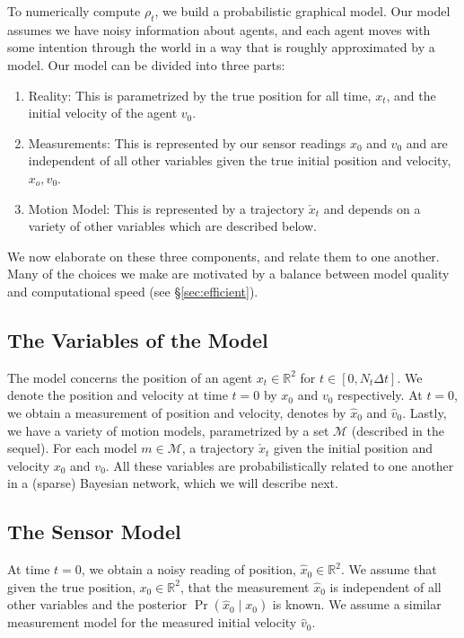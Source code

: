 \documentclass[letterpaper,10pt,conference]{ieeeconf}
\begin{document}
To numerically compute $\rho_t$, we build a probabilistic graphical model.
Our model assumes we have noisy information about agents, and each agent moves with some intention through the world in a way that is roughly approximated by a model.
Our model can be divided into three parts:
\begin{enumerate}
	\item Reality: This is parametrized by the true position for all time, $x_t$, and the initial velocity of the agent $v_0$.
	\item Measurements:  This is represented by our sensor readings $\hat{x}_0$ and $\hat{v}_0$ and are independent of all other variables given the true initial position and velocity, $x_o, v_0$.
	\item Motion Model: This is represented by a trajectory $\check{x}_t$ and depends on a variety of other variables which are described below.
\end{enumerate}
We now elaborate on these three components, and relate them to one another.
Many of the choices we make are motivated by a balance between model quality and computational speed (see \S \ref{sec:efficient}).

\subsection{The Variables of the Model}
The model concerns the position of an agent $x_t \in \mathbb{R}^2$ for $t \in [0,N_t \Delta t]$.
We denote the position and velocity at time $t=0$ by $x_0$ and $v_0$ respectively.
At $t=0$, we obtain a measurement of position and velocity, denotes by $\hat{x}_0$ and $\hat{v}_0$.
Lastly, we have a variety of motion models, parametrized by a set $\mathcal{M}$ (described in the sequel).
For each model $m \in \mathcal{M}$, a trajectory $\check{x}_t$ given the initial position and velocity $x_0$ and $v_0$.
All these variables are probabilistically related to one another in a (sparse) Bayesian network, which we will describe next.

\subsection{The Sensor Model}
At time $t=0$, we obtain a noisy reading of position, $\hat{x}_0 \in \mathbb{R}^2$.
We assume that given the true position, $x_0 \in \mathbb{R}^2$, that the measurement $\hat{x}_0$ is independent of all other variables and the posterior $\Pr( \hat{x}_0 \mid x_0)$ is known.
We assume a similar measurement model for the measured initial velocity $\hat{v}_0$.
\end{document}
